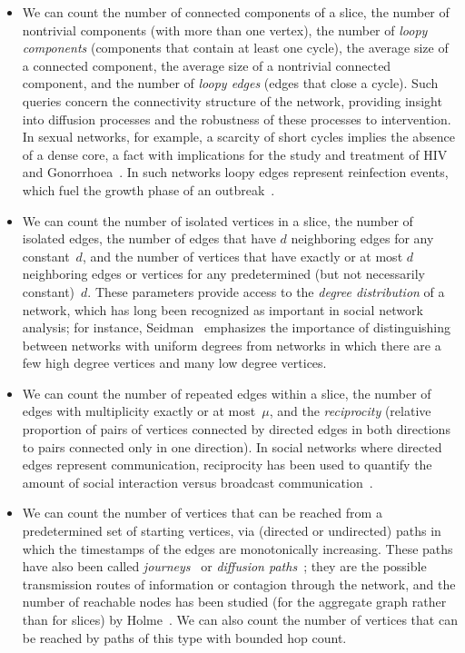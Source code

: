 \documentclass[11pt]{article}
\begin{document}
\begin{itemize}
\item We can count the number of connected components of a slice, the number of nontrivial components (with more than one vertex), the number of \emph{loopy components} (components that contain at least one cycle), the average size of a connected component,  the average size of a nontrivial connected component, and the number of \emph{loopy edges} (edges that close a cycle).  Such queries concern the connectivity structure of the network, providing insight into diffusion processes and the robustness of these processes to intervention.  In sexual networks, for example, a scarcity of short cycles implies the absence of a dense core, a fact with implications for the study and treatment of HIV \cite{BeaMooSto-AJS-04, PotPhiPlu-STI-02} and Gonorrhoea~\cite{DeSinWon-STI-04, PotMutRot-STI-02}. In such networks loopy edges represent reinfection events, which fuel the growth phase of an outbreak~\cite{PotMutRot-STI-02}.
\item We can count the number of isolated vertices in a slice, the number of isolated edges, the number of edges that have $d$ neighboring edges for any constant~$d$, and the number of vertices that have exactly or at most $d$ neighboring edges or vertices for any predetermined (but not necessarily constant)~$d$. These parameters provide access to the \emph{degree distribution} of a network, which has long been recognized as important in social network analysis; for instance, Seidman~\cite{Sei-SN-83} emphasizes the importance of distinguishing between networks with uniform degrees from networks in which there are a few high degree vertices and many low degree vertices.
\item We can count the number of repeated edges within a slice, the number of edges with multiplicity exactly or at most~$\mu$, and the \emph{reciprocity} (relative proportion of pairs of vertices connected by directed edges in both directions to pairs connected only in one direction). In social networks where directed edges represent communication, reciprocity has been used to quantify the amount of social interaction versus broadcast communication~\cite{Gong11, Diego04}.
\item We can count the number of vertices that can be reached from a predetermined set of starting vertices, via (directed or undirected) paths in which the timestamps of the edges are monotonically increasing. These paths have also been called \emph{journeys}~\cite{BuiFerJar-WiOpt-03} or \emph{diffusion paths}~\cite{Moo-SF-02}; they are the possible transmission routes of information or contagion through the network, and the number of reachable nodes has been studied (for the aggregate graph rather than for slices) by Holme~\cite{Hol-PRE-05}. We can also count the number of vertices that can be reached by paths of this type with bounded hop count.

\end{itemize}
\end{document}
